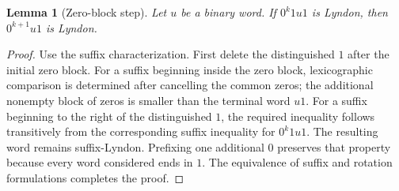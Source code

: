 \documentclass[11pt]{article}
\newtheorem{lemma}[theorem]{Lemma}
\theoremstyle{definition}
\theoremstyle{remark}
\begin{document}
\begin{lemma}[Zero-block step]\label{lem:step}
Let $u$ be a binary word.  If $0^k1u1$ is Lyndon, then $0^{k+1}u1$ is
Lyndon.
\end{lemma}
\begin{proof}
Use the suffix characterization.  First delete the distinguished $1$ after
the initial zero block.  For a suffix beginning inside the zero block,
lexicographic comparison is determined after cancelling the common zeros;
the additional nonempty block of zeros is smaller than the terminal word
$u1$.  For a suffix beginning to the right of the distinguished $1$, the
required inequality follows transitively from the corresponding suffix
inequality for $0^k1u1$.  The resulting word remains suffix-Lyndon.  Prefixing
one additional $0$ preserves that property because every word considered
ends in $1$.  The equivalence of suffix and rotation formulations completes
the proof.
\end{proof}
\end{document}
